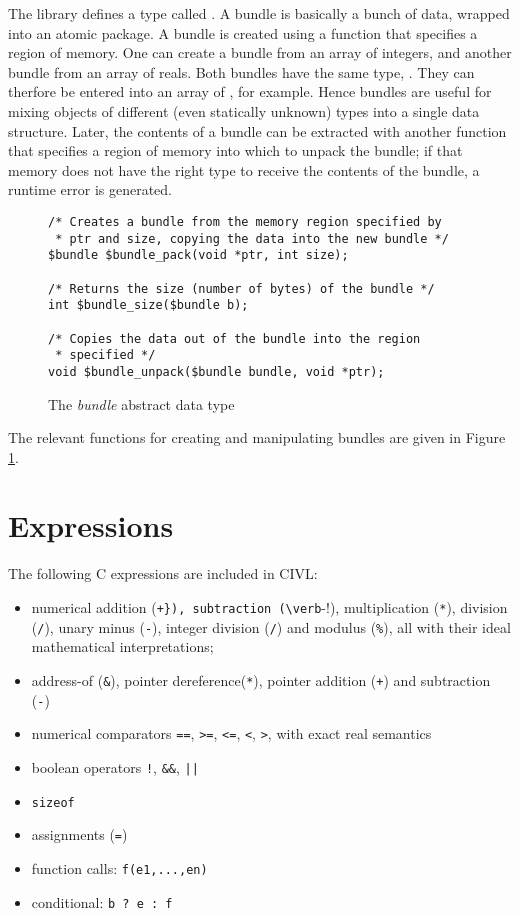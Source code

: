 The library defines a type called \cbundle. A bundle is basically a
bunch of data, wrapped into an atomic package.  A bundle is created
using a function that specifies a region of memory.  One can create a
bundle from an array of integers, and another bundle from an array of
reals.  Both bundles have the same type, \cbundle.  They can therfore
be entered into an array of \cbundle, for example.  Hence bundles are
useful for mixing objects of different (even statically unknown) types
into a single data structure.  Later, the contents of a bundle can be
extracted with another function that specifies a region of memory into
which to unpack the bundle; if that memory does not have the right
type to receive the contents of the bundle, a runtime error is
generated.

\begin{figure}
\begin{verbatim}
/* Creates a bundle from the memory region specified by
 * ptr and size, copying the data into the new bundle */
$bundle $bundle_pack(void *ptr, int size);

/* Returns the size (number of bytes) of the bundle */
int $bundle_size($bundle b);

/* Copies the data out of the bundle into the region
 * specified */
void $bundle_unpack($bundle bundle, void *ptr);
\end{verbatim}
  \caption{The \emph{bundle} abstract data type}
  \label{fig:bundle}
\end{figure}

The relevant functions for creating and manipulating bundles
are given in Figure \ref{fig:bundle}.

\section{Expressions}

The following C expressions are included in CIVL: 
\begin{itemize}
\item numerical addition (\verb!+}), subtraction (\verb!-!), multiplication
  (\verb!*!), division (\verb!/!), unary minus (\verb!-!),
  integer division (\verb!/!) and modulus (\verb!%!), all with
  their ideal mathematical interpretations;
\item address-of (\verb!&!), pointer dereference(\verb!*!),
  pointer addition (\verb!+!) and subtraction (\verb!-!)
\item numerical comparators \verb!==!, \verb!>=!, \verb!<=!, \verb!<!, \verb!>!,
  with exact real semantics
\item boolean operators \verb~!~, \verb!&&!, \verb!||!
\item \verb!sizeof!
\item assignments (\verb!=!)
\item function calls: \verb!f(e1,...,en)!
\item conditional: \verb!b ? e : f!
\end{itemize}

